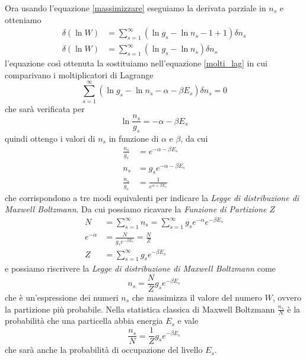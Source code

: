 Ora usando l'equazione \ref{massimizzare} eseguiamo la derivata parziale in $n_s$ e otteniamo
\begin{equation}
\begin{split}
\delta (\ln W) & = \sum_{s=1}^{\infty} (\ln g_s - \ln n_s - 1 + 1) \delta n_s \\
\delta (\ln W) & = \sum_{s=1}^{\infty} (\ln g_s - \ln n_s ) \delta n_s
\end{split}
\end{equation}
l'equazione così ottenuta la sostituiamo nell'equazione \ref{molti_lag} in cui comparivano i moltiplicatori di Lagrange
\begin{equation}
\sum_{s=1}^{\infty} (\ln g_s - \ln n_s - \alpha - \beta E_s) \delta n_s = 0
\end{equation}
che sarà verificata per
\begin{equation}
\ln \frac{ n_s}{g_s } = -\alpha - \beta E_s
\end{equation}
quindi ottengo i valori di $n_s$ in funzione di $\alpha$ e $\beta$, da cui
\begin{equation}
\begin{split}
\frac{ n_s}{g_s } & = e^{ -\alpha - \beta E_s } \\
n_s & = g_s e^{ -\alpha - \beta E_s } \\
\frac{ n_s}{g_s } & = \frac{ 1}{ e^{ \alpha + \beta E_s }  }
\end{split}
\end{equation}
che corrispondono a tre modi equivalenti per indicare la \textit{Legge di distribuzione di Maxwell Boltzmann}.
Da cui possiamo ricavare la \textit{Funzione di Partizione} $Z$
\begin{equation}
\begin{split}
N & = \sum_{s=1}^{\infty} n_s = \sum_{s=1}^{\infty} g_s e^{ -\alpha } e^{ -\beta E_s } \\
e^{ -\alpha } & = \frac{ N}{ g_s  e^{ -\beta E_s }} = \frac{ N}{Z } \\
Z & =  \sum_{s=1}^{\infty} g_s e^{ -\beta E_s }
\end{split}
\end{equation}
e possiamo riscrivere la \textit{Legge di distribuzione di Maxwell Boltzmann} come
\begin{equation}
n_s = \frac{ N}{Z } g_s e^{ -\beta E_s }
\end{equation}
che è un'espressione dei numeri $n_s$ che massimizza il valore del numero $W$, ovvero la partizione più probabile.
Nella statistica classica di Maxwell Boltzmann $\frac{ n_s}{N }$ è la probabilità che una particella abbia energia $E_s$ e vale
\begin{equation}
\frac{ n_s }{N } = \frac{ 1}{Z } g_s e^{ -\beta E_s }
\end{equation}
che sarà anche la probabilità di occupazione del livello $E_s$.


